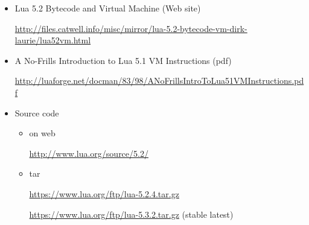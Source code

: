 \begin{frame}
	\frametitlesec
	\begin{itemize}
		\item Lua 5.2 Bytecode and Virtual Machine (Web site)

			{\tiny{\url{http://files.catwell.info/misc/mirror/lua-5.2-bytecode-vm-dirk-laurie/lua52vm.html}}}

		\item A No-Frills Introduction to Lua 5.1 VM Instructions (pdf)

			{\tiny\url{http://luaforge.net/docman/83/98/ANoFrillsIntroToLua51VMInstructions.pdf}}
		\item Source code
			\begin{itemize}
				\item on web

					{\tiny\url{http://www.lua.org/source/5.2/}}
				\item tar

					{\tiny\url{https://www.lua.org/ftp/lua-5.2.4.tar.gz}}

					{\tiny\url{https://www.lua.org/ftp/lua-5.3.2.tar.gz} (stable latest)}
			\end{itemize}
	\end{itemize}
\end{frame}
